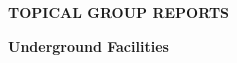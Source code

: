 

  \vfill

\begin{center}
\begin{Huge}   {\bf  TOPICAL GROUP REPORTS}

\bigskip

\bigskip

 {\bf Underground Facilities}

\vfill

\vfill

\end{Huge}
\end{center}

\newpage
\thispagestyle{empty}
\mbox{\null}


